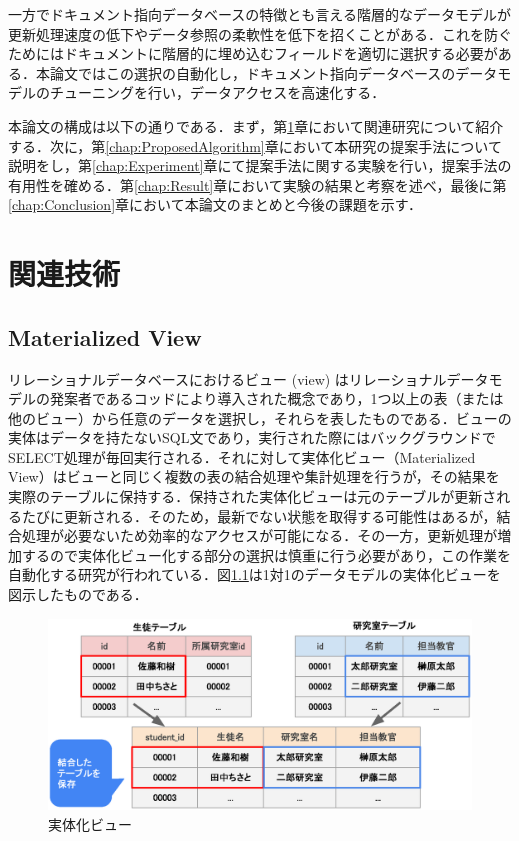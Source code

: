 \documentclass[a4paper,11pt]{ujreport}
\begin{document}
一方でドキュメント指向データベースの特徴とも言える階層的なデータモデルが更新処理速度の低下やデータ参照の柔軟性を低下を招くことがある．これを防ぐためにはドキュメントに階層的に埋め込むフィールドを適切に選択する必要がある．本論文ではこの選択の自動化し，ドキュメント指向データベースのデータモデルのチューニングを行い，データアクセスを高速化する．

本論文の構成は以下の通りである．まず，第\ref{chap:LiteratureReview}章において関連研究について紹介する．次に，第\ref{chap:ProposedAlgorithm}章において本研究の提案手法について説明をし，第\ref{chap:Experiment}章にて提案手法に関する実験を行い，提案手法の有用性を確める．第\ref{chap:Result}章において実験の結果と考察を述べ，最後に第\ref{chap:Conclusion}章において本論文のまとめと今後の課題を示す．

\chapter{関連技術}
\label{chap:LiteratureReview}
\section{Materialized View}
リレーショナルデータベースにおけるビュー (view) はリレーショナルデータモデルの発案者であるコッドにより導入された概念であり\cite{Codd1974RecentII}，1つ以上の表（または他のビュー）から任意のデータを選択し，それらを表したものである．ビューの実体はデータを持たないSQL文であり，実行された際にはバックグラウンドでSELECT処理が毎回実行される．それに対して実体化ビュー（Materialized View）はビューと同じく複数の表の結合処理や集計処理を行うが，その結果を実際のテーブルに保持する．保持された実体化ビューは元のテーブルが更新されるたびに更新される．そのため，最新でない状態を取得する可能性はあるが，結合処理が必要ないため効率的なアクセスが可能になる．その一方，更新処理が増加するので実体化ビュー化する部分の選択は慎重に行う必要があり，この作業を自動化する研究が行われている\cite{mistry2001materialized}．図\ref{figure:MvDescription}は1対1のデータモデルの実体化ビューを図示したものである．
\begin{figure}[htbp]
	\begin{center}
		\includegraphics[width=32em, trim=0 5em 0 0]{src/MvDescription.eps} %
	\end{center}
	\caption{実体化ビュー}
	\label{figure:MvDescription}
\end{figure}
\end{document}

